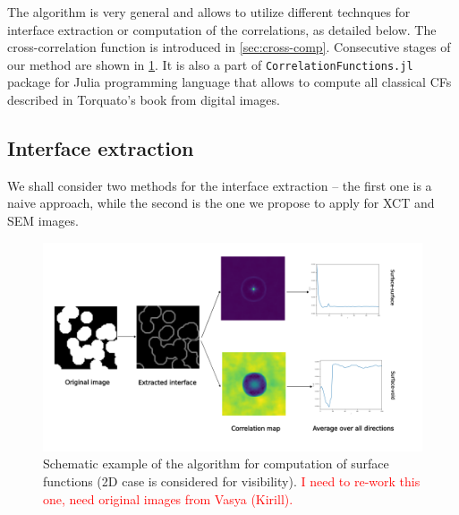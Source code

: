 \documentclass[reprint,amsmath,amssymb,aps,pre,showkeys,showpacs]{revtex4-1}
\newcommand{\code}[1]{\colorbox{light-gray}{\texttt{#1}}}
\begin{document}
The algorithm is very general and allows to utilize different technques for
interface extraction or computation of the correlations, as detailed below. The
cross-correlation function is introduced in \cref{sec:cross-comp}. Consecutive
stages of our method are shown in \cref{fig:stages}. It is also a part of
\code{CorrelationFunctions.jl} package \cite{CFsjlpaper} for Julia programming
language that allows to compute all classical CFs described in Torquato’s book
\cite{Torquato_book} from digital images.

\subsection{Interface extraction}
We shall consider two methods for the interface extraction -- the first one is a
naive approach, while the second is the one we propose to apply for XCT and SEM
images.

\begin{figure}
  \centering \includegraphics[width=\linewidth]{images/algo.png}
  \caption{Schematic example of the algorithm for computation of surface
    functions (2D case is considered for visibility). \textcolor{red}{I need to
      re-work this one, need original images from Vasya (Kirill).}}
  \label{fig:stages}
\end{figure}
\end{document}
